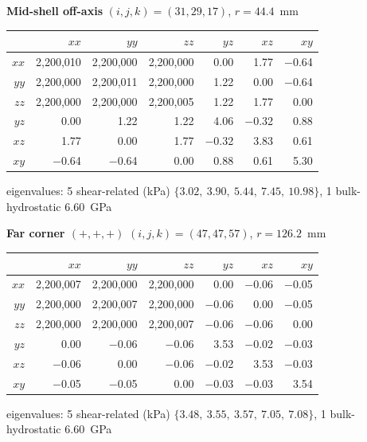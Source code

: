 \documentclass[11pt,letterpaper]{article}
\begin{document}
\textbf{Mid-shell off-axis} \quad $(i,j,k)=(31,29,17)$, $r=44.4$~mm
\begin{center}\scriptsize
\begin{tabular}{r|rrrrrr}
\toprule
 & $xx$ & $yy$ & $zz$ & $yz$ & $xz$ & $xy$ \\
\midrule
$xx$ & \phantom{$-$}2,200,010 & \phantom{$-$}2,200,000 & \phantom{$-$}2,200,000 & \phantom{$-$}0.00 & \phantom{$-$}1.77 & $-$0.64 \\
$yy$ & \phantom{$-$}2,200,000 & \phantom{$-$}2,200,011 & \phantom{$-$}2,200,000 & \phantom{$-$}1.22 & \phantom{$-$}0.00 & $-$0.64 \\
$zz$ & \phantom{$-$}2,200,000 & \phantom{$-$}2,200,000 & \phantom{$-$}2,200,005 & \phantom{$-$}1.22 & \phantom{$-$}1.77 & \phantom{$-$}0.00 \\
$yz$ & \phantom{$-$}0.00 & \phantom{$-$}1.22 & \phantom{$-$}1.22 & \phantom{$-$}4.06 & $-$0.32 & \phantom{$-$}0.88 \\
$xz$ & \phantom{$-$}1.77 & \phantom{$-$}0.00 & \phantom{$-$}1.77 & $-$0.32 & \phantom{$-$}3.83 & \phantom{$-$}0.61 \\
$xy$ & $-$0.64 & $-$0.64 & \phantom{$-$}0.00 & \phantom{$-$}0.88 & \phantom{$-$}0.61 & \phantom{$-$}5.30 \\
\bottomrule
\end{tabular}
\end{center}
\vspace{-4pt}\noindent\hspace{1em}\scriptsize eigenvalues: 5 shear-related (kPa) $\{3.02,\ 3.90,\ 5.44,\ 7.45,\ 10.98\}$, 1 bulk-hydrostatic $6.60$~GPa

\textbf{Far corner $(+,+,+)$} \quad $(i,j,k)=(47,47,57)$, $r=126.2$~mm
\begin{center}\scriptsize
\begin{tabular}{r|rrrrrr}
\toprule
 & $xx$ & $yy$ & $zz$ & $yz$ & $xz$ & $xy$ \\
\midrule
$xx$ & \phantom{$-$}2,200,007 & \phantom{$-$}2,200,000 & \phantom{$-$}2,200,000 & \phantom{$-$}0.00 & $-$0.06 & $-$0.05 \\
$yy$ & \phantom{$-$}2,200,000 & \phantom{$-$}2,200,007 & \phantom{$-$}2,200,000 & $-$0.06 & \phantom{$-$}0.00 & $-$0.05 \\
$zz$ & \phantom{$-$}2,200,000 & \phantom{$-$}2,200,000 & \phantom{$-$}2,200,007 & $-$0.06 & $-$0.06 & \phantom{$-$}0.00 \\
$yz$ & \phantom{$-$}0.00 & $-$0.06 & $-$0.06 & \phantom{$-$}3.53 & $-$0.02 & $-$0.03 \\
$xz$ & $-$0.06 & \phantom{$-$}0.00 & $-$0.06 & $-$0.02 & \phantom{$-$}3.53 & $-$0.03 \\
$xy$ & $-$0.05 & $-$0.05 & \phantom{$-$}0.00 & $-$0.03 & $-$0.03 & \phantom{$-$}3.54 \\
\bottomrule
\end{tabular}
\end{center}
\vspace{-4pt}\noindent\hspace{1em}\scriptsize eigenvalues: 5 shear-related (kPa) $\{3.48,\ 3.55,\ 3.57,\ 7.05,\ 7.08\}$, 1 bulk-hydrostatic $6.60$~GPa
\end{document}
